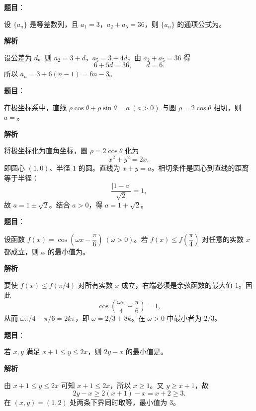 \begin{answer}

\textbf{题目}：

设 $\{a_n\}$ 是等差数列，且 $a_1=3$，$a_2+a_5=36$，则 $\{a_n\}$ 的通项公式为\gkblank{}。

\textbf{解析}

设公差为 $d$。则 $a_2=3+d$，$a_5=3+4d$，由 $a_2+a_5=36$ 得
\nopagebreak[4]
\[
6+5d=36,\qquad d=6.
\]
所以 $a_n=3+6(n-1)=6n-3$。


\end{answer}
\begin{answer}

\textbf{题目}：

在极坐标系中，直线 $\rho\cos\theta+\rho\sin\theta=a\ (a>0)$ 与圆 $\rho=2\cos\theta$ 相切，则 $a=$\gkblank{}。

\textbf{解析}

将极坐标化为直角坐标，圆 $\rho=2\cos\theta$ 化为
\nopagebreak[4]
\[
x^2+y^2=2x,
\]
即圆心 $(1,0)$、半径 $1$ 的圆。直线为 $x+y=a$。相切条件是圆心到直线的距离等于半径：
\nopagebreak[4]
\[
\frac{|1-a|}{\sqrt2}=1,
\]
故 $a=1\pm\sqrt2$。结合 $a>0$，得 $a=1+\sqrt2$。


\end{answer}
\begin{answer}

\textbf{题目}：

设函数 $f(x)=\cos\left(\omega x-\dfrac\pi6\right)\ (\omega>0)$。若 $f(x)\leqslant f\left(\dfrac\pi4\right)$ 对任意的实数 $x$ 都成立，则 $\omega$ 的最小值为\gkblank{}。

\textbf{解析}

要使 $f(x)\leqslant f(\pi/4)$ 对所有实数 $x$ 成立，右端必须是余弦函数的最大值 $1$。因此
\nopagebreak[4]
\[
\cos\left(\frac{\omega\pi}{4}-\frac\pi6\right)=1,
\]
从而 $\omega\pi/4-\pi/6=2k\pi$，即 $\omega=2/3+8k$。在 $\omega>0$ 中最小者为 $2/3$。


\end{answer}
\begin{answer}

\textbf{题目}：

若 $x,y$ 满足 $x+1\leqslant y\leqslant2x$，则 $2y-x$ 的最小值是\gkblank{}。

\textbf{解析}

由 $x+1\leqslant y\leqslant2x$ 可知 $x+1\leqslant2x$，所以 $x\geqslant1$。又 $y\geqslant x+1$，故
\nopagebreak[4]
\[
2y-x\geqslant2(x+1)-x=x+2\geqslant3.
\]
在 $(x,y)=(1,2)$ 处两条下界同时取等，最小值为 $3$。


\end{answer}
